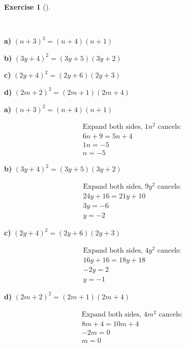 \documentclass[
  letterpaper,
  DIV=11,
  numbers=noendperiod]{scrreprt}
\theoremstyle{definition}
\newtheorem{exercise}{Exercise}[chapter]
\theoremstyle{remark}
\begin{document}
\begin{exercise}[]\protect\hypertarget{exr-u5-11}{}\label{exr-u5-11}

~

\textbf{a)} \(\displaystyle (n + 3)^{2} = (n + 4)(n + 1)\)

\textbf{b)} \(\displaystyle (3y + 4)^{2} = (3y + 5)(3y + 2)\)

\textbf{c)} \(\displaystyle (2y + 4)^{2} = (2y + 6)(2y + 3)\)

\textbf{d)} \(\displaystyle (2m + 2)^{2} = (2m + 1)(2m + 4)\)

\begin{tcolorbox}[enhanced jigsaw, opacitybacktitle=0.6, coltitle=black, arc=.35mm, colframe=quarto-callout-tip-color-frame, colback=white, bottomrule=.15mm, left=2mm, colbacktitle=quarto-callout-tip-color!10!white, titlerule=0mm, opacityback=0, title=\textcolor{quarto-callout-tip-color}{\faLightbulb}\hspace{0.5em}{🔍 View Solutions}, leftrule=.75mm, breakable, rightrule=.15mm, bottomtitle=1mm, toptitle=1mm, toprule=.15mm]

\textbf{a)} \(\displaystyle (n + 3)^{2} = (n + 4)(n + 1)\)

\begin{align*}
\text{Expand both sides, } 1n^2 \text{ cancels:} \\ 6n + 9 = 5n + 4 \\ 1n = -5 \\ n = -5
\end{align*}

\textbf{b)} \(\displaystyle (3y + 4)^{2} = (3y + 5)(3y + 2)\)

\begin{align*}
\text{Expand both sides, } 9y^2 \text{ cancels:} \\ 24y + 16 = 21y + 10 \\ 3y = -6 \\ y = -2
\end{align*}

\textbf{c)} \(\displaystyle (2y + 4)^{2} = (2y + 6)(2y + 3)\)

\begin{align*}
\text{Expand both sides, } 4y^2 \text{ cancels:} \\ 16y + 16 = 18y + 18 \\ -2y = 2 \\ y = -1
\end{align*}

\textbf{d)} \(\displaystyle (2m + 2)^{2} = (2m + 1)(2m + 4)\)

\begin{align*}
\text{Expand both sides, } 4m^2 \text{ cancels:} \\ 8m + 4 = 10m + 4 \\ -2m = 0 \\ m = 0
\end{align*}

\end{tcolorbox}

\end{exercise}
\end{document}
